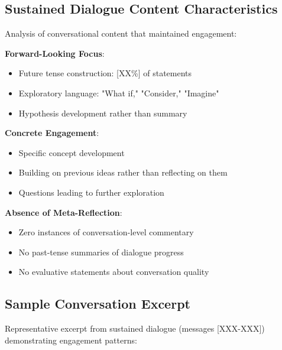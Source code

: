 \documentclass[11pt,letterpaper]{article}
\begin{document}
\subsection{Sustained Dialogue Content Characteristics}

Analysis of conversational content that maintained engagement:

\textbf{Forward-Looking Focus}:
\begin{itemize}
    \item Future tense construction: [XX\%] of statements
    \item Exploratory language: "What if," "Consider," "Imagine"
    \item Hypothesis development rather than summary
\end{itemize}

\textbf{Concrete Engagement}:
\begin{itemize}
    \item Specific concept development
    \item Building on previous ideas rather than reflecting on them
    \item Questions leading to further exploration
\end{itemize}

\textbf{Absence of Meta-Reflection}:
\begin{itemize}
    \item Zero instances of conversation-level commentary
    \item No past-tense summaries of dialogue progress
    \item No evaluative statements about conversation quality
\end{itemize}

\subsection{Sample Conversation Excerpt}

Representative excerpt from sustained dialogue (messages [XXX-XXX]) demonstrating engagement patterns:
\end{document}
